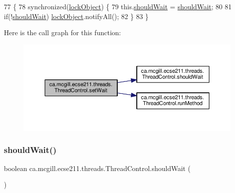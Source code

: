 \begin{DoxyCode}
77                                           \{
78     \textcolor{keyword}{synchronized}(\hyperlink{classca_1_1mcgill_1_1ecse211_1_1threads_1_1_thread_control_ab20c44ff2dafab8981c42fa8bf634dfc}{lockObject}) \{
79       this.\hyperlink{classca_1_1mcgill_1_1ecse211_1_1threads_1_1_thread_control_a9c3896500e86e402b8019e1be6500621}{shouldWait} = \hyperlink{classca_1_1mcgill_1_1ecse211_1_1threads_1_1_thread_control_a9c3896500e86e402b8019e1be6500621}{shouldWait};
80       
81       \textcolor{keywordflow}{if}(!\hyperlink{classca_1_1mcgill_1_1ecse211_1_1threads_1_1_thread_control_a9c3896500e86e402b8019e1be6500621}{shouldWait}) \hyperlink{classca_1_1mcgill_1_1ecse211_1_1threads_1_1_thread_control_ab20c44ff2dafab8981c42fa8bf634dfc}{lockObject}.notifyAll();
82     \}
83   \}
\end{DoxyCode}
Here is the call graph for this function\+:\nopagebreak
\begin{figure}[H]
\begin{center}
\leavevmode
\includegraphics[width=350pt]{classca_1_1mcgill_1_1ecse211_1_1threads_1_1_thread_control_a7759a6f52b56e15cb37cd25ea31c93c1_cgraph}
\end{center}
\end{figure}
\mbox{\label{classca_1_1mcgill_1_1ecse211_1_1threads_1_1_thread_control_a9c3896500e86e402b8019e1be6500621}} 
\subsubsection{\texorpdfstring{should\+Wait()}{shouldWait()}}
{\footnotesize\ttfamily boolean ca.\+mcgill.\+ecse211.\+threads.\+Thread\+Control.\+should\+Wait (\begin{DoxyParamCaption}{ }\end{DoxyParamCaption})}

